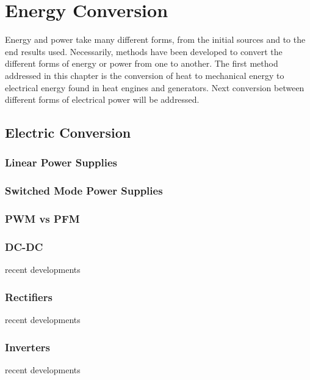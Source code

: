 \chapter{Energy Conversion}
\label{ch:conv}

Energy and power take many different forms, from the initial sources and to the end results used. Necessarily, methods have been developed to convert the different forms of energy or power from one to another. The first method addressed in this chapter is the conversion of heat to mechanical energy to electrical energy found in heat engines and generators. Next conversion between different forms of electrical power will be addressed.


\section{Electric Conversion}

\subsection{Linear Power Supplies}

\subsection{Switched Mode Power Supplies}

\subsection{PWM vs PFM}

\subsection{DC-DC}
recent developments

\subsection{Rectifiers}
recent developments

\subsection{Inverters}
recent developments
